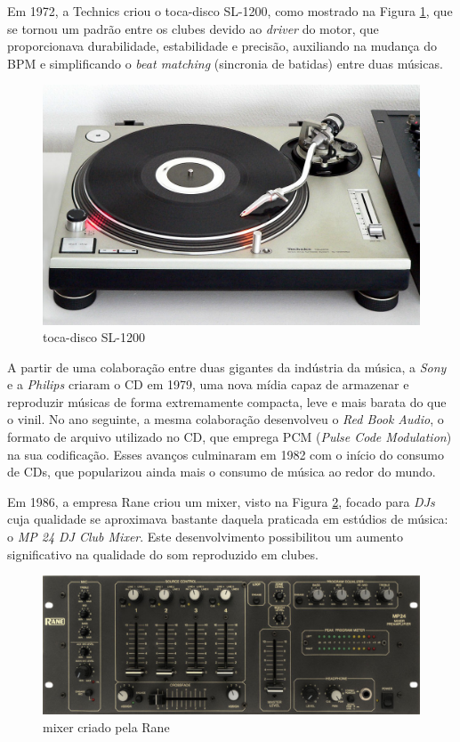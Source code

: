 Em 1972, a Technics criou o toca-disco SL-1200, como mostrado na Figura \ref{fig14}, que se tornou um padrão entre os clubes devido ao \textit{driver} do motor, que proporcionava durabilidade, estabilidade e precisão, auxiliando na mudança do BPM e simplificando o \textit{beat matching} (sincronia de batidas) entre duas músicas.

\begin{figure}[h]
	\centering
    \includegraphics[scale=0.25]{figuras/fig14.png}
	\caption{toca-disco SL-1200 \cite{wikimediaFileTechnicsSL1200MK22jpg}}
	\label{fig14}
\end{figure}

A partir de uma colaboração entre duas gigantes da indústria da música, a \textit{Sony} e a \textit{Philips} criaram o CD em 1979, uma nova mídia capaz de armazenar e reproduzir músicas de forma extremamente compacta, leve e mais barata do que o vinil. No ano seguinte, a mesma colaboração desenvolveu o \textit{Red Book Audio}, o formato de arquivo utilizado no CD, que emprega PCM (\textit{Pulse Code Modulation}) na sua codificação. Esses avanços culminaram em 1982 com o início do consumo de CDs, que popularizou ainda mais o consumo de música ao redor do mundo.

Em 1986, a empresa Rane criou um mixer, visto na Figura \ref{fig15}, focado para \textit{DJs} cuja qualidade se aproximava bastante daquela praticada em estúdios de música: o \textit{MP 24 DJ Club Mixer}. Este desenvolvimento possibilitou um aumento significativo na qualidade do som reproduzido em clubes.

\begin{figure}[h]
	\centering
    \includegraphics[scale=0.3]{figuras/fig15.eps}
	\caption{mixer criado pela Rane \cite{ranecommercialMixerEvolution}}
	\label{fig15}
\end{figure}


